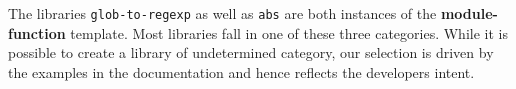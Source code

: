 \documentclass[english,cleveref,autoref,submission]{programming}
\begin{document}
The libraries \texttt{glob-to-regexp} as well as \texttt{abs} are both instances of the
\textbf{module-function} template.
Most libraries fall in one of these three categories. 
While it is possible to create a library of undetermined category, our selection is driven
by the examples in the documentation and 
hence reflects the developers intent.












\end{document}
